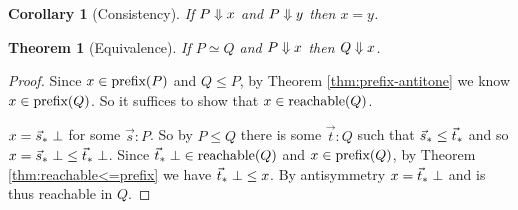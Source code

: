 \documentclass{article}
\newcommand{\todo}[1]{{\color{red}{#1}}}
\newtheorem{theorem}{Theorem}
\newtheorem{corollary}{Corollary}
\begin{document}
\begin{corollary}[Consistency]
  If $P \Downarrow x$ and $P \Downarrow y$ then $x = y$.
\end{corollary}

\todo{Couldn't I prove a more traditional ``confluence'' theorem as well?}

\begin{theorem}[Equivalence]
  If $P \simeq Q$ and $P \Downarrow x$ then $Q \Downarrow x$.
\end{theorem}

\begin{proof}
  Since $x \in \text{prefix}(P)$ and $Q \le P$, by Theorem \ref{thm:prefix-antitone}
  we know $x \in \text{prefix}(Q)$. So it suffices to show that $x \in \text{reachable}(Q)$.

  $x = {\vec{s}_*}\;\bot$ for some $\vec{s} : P$. So by $P \le Q$ there is some
  $\vec{t} : Q$ such that ${\vec{s}_*} \le {\vec{t}_*}$ and so $x = {\vec{s}_*}\; \bot \le
  {\vec{t}_*}\;\bot$. Since ${\vec{t}_*}\;\bot \in \text{reachable}(Q)$ and $x \in \text{prefix}(Q)$, by
  Theorem \ref{thm:reachable<=prefix} we have ${\vec{t}_*}\;\bot \le x$. By
  antisymmetry $x = {\vec{t}_*}\;\bot$ and is thus reachable in $Q$.
\end{proof}
\end{document}

